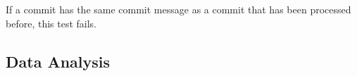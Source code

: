 If a commit has the same commit message as a commit that has been processed before, this test fails.


\subsection{Data Analysis}
\label{sub:analysis}

%
%
%
%
%
%

